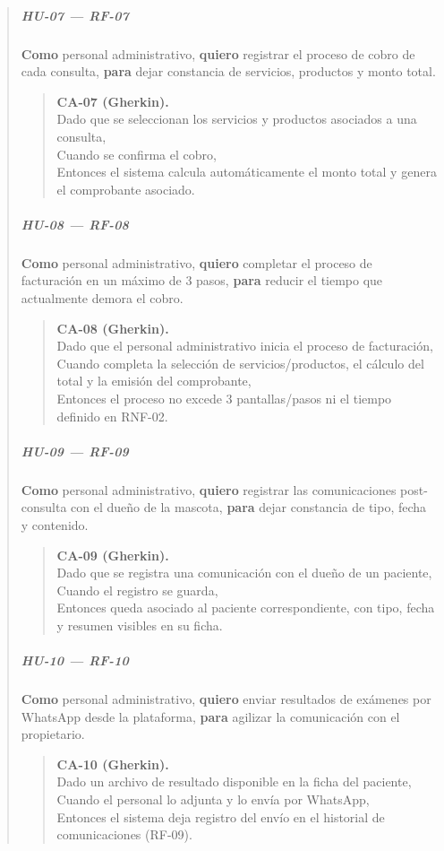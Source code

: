 \documentclass[
]{article}
\begin{document}
\begin{quote}
\subparagraph{HU-07 --- RF-07}
\textbf{Como} personal administrativo,
\textbf{quiero} registrar el proceso de cobro de cada consulta,
\textbf{para} dejar constancia de servicios, productos y monto total.

\begin{quote}
\textbf{CA-07 (Gherkin).} \\
Dado que se seleccionan los servicios y productos asociados a una consulta, \\
Cuando se confirma el cobro, \\
Entonces el sistema calcula automáticamente el monto total y genera el comprobante asociado.
\end{quote}

\subparagraph{HU-08 --- RF-08}
\textbf{Como} personal administrativo,
\textbf{quiero} completar el proceso de facturación en un máximo de 3 pasos,
\textbf{para} reducir el tiempo que actualmente demora el cobro.

\begin{quote}
\textbf{CA-08 (Gherkin).} \\
Dado que el personal administrativo inicia el proceso de facturación, \\
Cuando completa la selección de servicios/productos, el cálculo del total y la emisión del comprobante, \\
Entonces el proceso no excede 3 pantallas/pasos ni el tiempo definido en RNF-02.
\end{quote}

\subparagraph{HU-09 --- RF-09}
\textbf{Como} personal administrativo,
\textbf{quiero} registrar las comunicaciones post-consulta con el dueño de la mascota,
\textbf{para} dejar constancia de tipo, fecha y contenido.

\begin{quote}
\textbf{CA-09 (Gherkin).} \\
Dado que se registra una comunicación con el dueño de un paciente, \\
Cuando el registro se guarda, \\
Entonces queda asociado al paciente correspondiente, con tipo, fecha y resumen visibles en su ficha.
\end{quote}

\subparagraph{HU-10 --- RF-10}
\textbf{Como} personal administrativo,
\textbf{quiero} enviar resultados de exámenes por WhatsApp desde la plataforma,
\textbf{para} agilizar la comunicación con el propietario.

\begin{quote}
\textbf{CA-10 (Gherkin).} \\
Dado un archivo de resultado disponible en la ficha del paciente, \\
Cuando el personal lo adjunta y lo envía por WhatsApp, \\
Entonces el sistema deja registro del envío en el historial de comunicaciones (RF-09).
\end{quote}


\end{quote}
\end{document}

